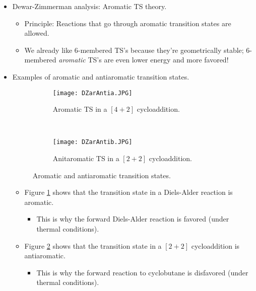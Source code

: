 \documentclass[../notes.tex]{subfiles}
\begin{document}
\begin{itemize}
\begin{itemize}
    \end{itemize}
    \item Dewar-Zimmerman analysis: Aromatic TS theory.
    \begin{itemize}
        \item Principle: Reactions that go through aromatic transition states are allowed.
        \item We already like 6-membered TS's because they're geometrically stable; 6-membered \emph{aromatic} TS's are even lower energy and more favored!
    \end{itemize}
    \item Examples of aromatic and antiaromatic transition states.
    \begin{figure}[h!]
        \centering
        \begin{subfigure}[b]{0.5\linewidth}
            \centering
            \texttt{[image: DZarAntia.JPG]}
            \caption{Aromatic TS in a $[4+2]$ cycloaddition.}
            \label{fig:DZarAntia}
        \end{subfigure}\\[2em]
        \begin{subfigure}[b]{0.5\linewidth}
            \centering
            \texttt{[image: DZarAntib.JPG]}
            \caption{Anitaromatic TS in a $[2+2]$ cycloaddition.}
            \label{fig:DZarAntib}
        \end{subfigure}
        \caption{Aromatic and antiaromatic transition states.}
        \label{fig:DZarAnti}
    \end{figure}
    \begin{itemize}
        \item Figure \ref{fig:DZarAntia} shows that the transition state in a Diels-Alder reaction is aromatic.
        \begin{itemize}
            \item This is why the forward Diels-Alder reaction is favored (under thermal conditions).
        \end{itemize}
        \item Figure \ref{fig:DZarAntib} shows that the transition state in a $[2+2]$ cycloaddition is antiaromatic.
        \begin{itemize}
            \item This is why the forward reaction to cyclobutane is disfavored (under thermal conditions).
        \end{itemize}
    \end{itemize}

\end{itemize}
\end{document}
